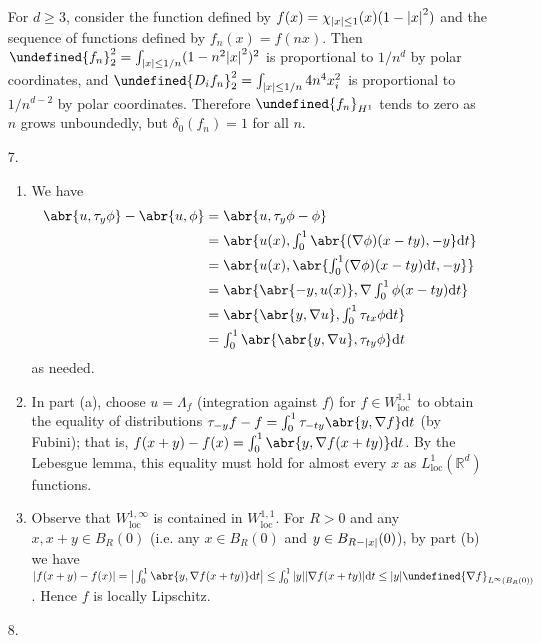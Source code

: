 \documentclass[11pt,leqno]{article}
\theoremstyle{plain}
\theoremstyle{definition}
\numberwithin{equation}{section}
\numberwithin{lem}{section}
\let\norm\undefined %
\DeclarePairedDelimiter\norm{\lVert}{\rVert}
\begin{document}
\begin{enumerate}
    For $d\geq 3$, consider the function defined by $f(x) = \chi_{\abs{x}\leq 1}(x)(1-\abs{x}^2)$ and the sequence of functions defined by $f_n(x) = f(nx)$. Then $\norm{f_n}_2^2 = \int_{\abs{x}\leq 1/n}(1-n^2\abs{x}^2)^2$ is proportional to $1/n^d$ by polar coordinates, and $\norm{D_if_n}_2^2 = \int_{\abs{x}\leq 1/n}4n^4x_i^2$ is proportional to $1/n^{d-2}$ by polar coordinates. Therefore $\norm{f_n}_{H^1}$ tends to zero as $n$ grows unboundedly, but $\delta_0(f_n) = 1$ for all $n$.
    \item[7.] \begin{enumerate}
      \item We have \begin{align*}
        \abr{u,\tau_y\phi} - \abr{u,\phi} &= \abr{u,\tau_y\phi - \phi} \\
        &= \abr{u(x),\textstyle\int_0^1\abr{(\nabla\phi)(x-ty),-y}\dd t}\\
        &= \abr{u(x),\abr{\textstyle\int_0^1(\nabla\phi)(x-ty)\dd t,-y}}\\
        &= \abr{\abr{-y,u(x)},\nabla\textstyle\int_0^1\phi(x-ty)\dd t}\\
        &= \abr{\abr{y,\nabla u},\textstyle\int_0^1\tau_{tx}\phi\dd t}\\
        &= \textstyle\int_0^1\abr{\abr{y,\nabla u},\tau_{ty}\phi}\dd t
      \end{align*} as needed.
      \item In part (a), choose $u = \Lambda_f$ (integration against $f$) for $f\in W^{1,1}_{\mathrm{loc}}$ to obtain the equality of distributions $\tau_{-y}f-f = \int_0^1\tau_{-ty}\abr{y,\nabla f}\dd t$ (by Fubini); that is, $f(x+y)-f(x) = \int_0^1 \abr{y,\nabla f(x+ty)}\dd t$. By the Lebesgue lemma, this equality must hold for almost every $x$ as $L^1_{\mathrm{loc}}(\mathbb R^d)$ functions.
      \item Observe that $W^{1,\infty}_{\mathrm{loc}}$ is contained in $W^{1,1}_{\mathrm{loc}}$. For $R>0$ and any $x,x+y\in B_R(0)$ (i.e. any $x\in B_R(0)$ and $y\in B_{R-\abs{x}}(0)$), by part (b) we have $\abs{f(x+y) - f(x)} = \big|\int_0^1\abr{y,\nabla f(x+ty)}\dd t\big|\leq \int_0^1\abs{y}\abs{\nabla f(x+ty)}\dd t\leq \abs{y}\norm{\nabla f}_{L^{\infty}(B_R(0))}$. Hence $f$ is locally Lipschitz.
    \end{enumerate}
    \item[8.] \begin{enumerate}

\end{enumerate}
\end{enumerate}
\end{document}
